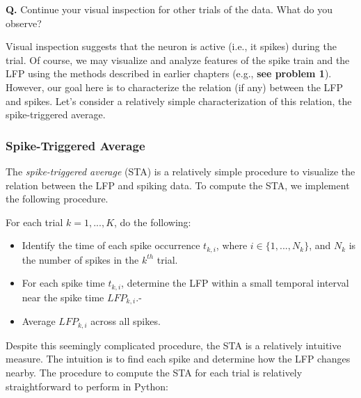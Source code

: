 \documentclass[11pt]{article}
\begin{document}
    \textbf{Q.} Continue your visual inspection for other trials of the
data. What do you observe?

    Visual inspection suggests that the neuron is active (i.e., it spikes)
during the trial. Of course, we may visualize and analyze features of
the spike train and the LFP using the methods described in earlier
chapters (e.g., \textbf{see problem 1}). However, our goal here is to
characterize the relation (if any) between the LFP and spikes. Let's
consider a relatively simple characterization of this relation, the
spike-triggered average.

    \subsubsection{Spike-Triggered Average}\label{spike-triggered-average}

    The \emph{spike-triggered average} (STA) is a relatively simple
procedure to visualize the relation between the LFP and spiking data. To
compute the STA, we implement the following procedure.

For each trial \(k = {1,...,K}\), do the following:

\begin{itemize}
\item
  Identify the time of each spike occurrence \(t_{k,i}\), where
  \(i \in \{1,...,N_k\}\), and \(N_{k}\) is the number of spikes in the
  \(k^{th}\) trial.
\item
  For each spike time \(t_{k,i}\), determine the LFP within a small
  temporal interval near the spike time \(LFP_{k,i}\).-
\item
  Average \(LFP_{k,i}\) across all spikes.
\end{itemize}

Despite this seemingly complicated procedure, the STA is a relatively
intuitive measure. The intuition is to find each spike and determine how
the LFP changes nearby. The procedure to compute the STA for each trial
is relatively straightforward to perform in Python:
\end{document}
